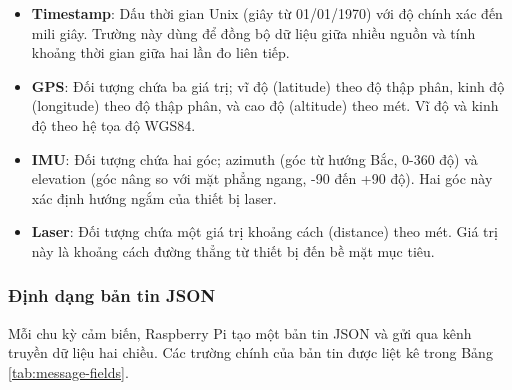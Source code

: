 \begin{itemize}
    \item \textbf{Timestamp}: Dấu thời gian Unix (giây từ 01/01/1970) với độ chính xác đến mili giây. Trường này dùng để đồng bộ dữ liệu giữa nhiều nguồn và tính khoảng thời gian giữa hai lần đo liên tiếp.
    \item \textbf{GPS}: Đối tượng chứa ba giá trị; vĩ độ (latitude) theo độ thập phân, kinh độ (longitude) theo độ thập phân, và cao độ (altitude) theo mét. Vĩ độ và kinh độ theo hệ tọa độ WGS84.
    \item \textbf{IMU}: Đối tượng chứa hai góc; azimuth (góc từ hướng Bắc, 0-360 độ) và elevation (góc nâng so với mặt phẳng ngang, -90 đến +90 độ). Hai góc này xác định hướng ngắm của thiết bị laser.
    \item \textbf{Laser}: Đối tượng chứa một giá trị khoảng cách (distance) theo mét. Giá trị này là khoảng cách đường thẳng từ thiết bị đến bề mặt mục tiêu.
\end{itemize}

\subsubsection{Định dạng bản tin JSON}

\hspace{0.5cm} Mỗi chu kỳ cảm biến, Raspberry Pi tạo một bản tin JSON và gửi qua kênh truyền dữ liệu hai chiều. Các trường chính của bản tin được liệt kê trong Bảng \ref{tab:message-fields}.

\begin{table}[H]
\centering
\caption{Các trường trong bản tin JSON}
\label{tab:message-fields}
\end{table}

